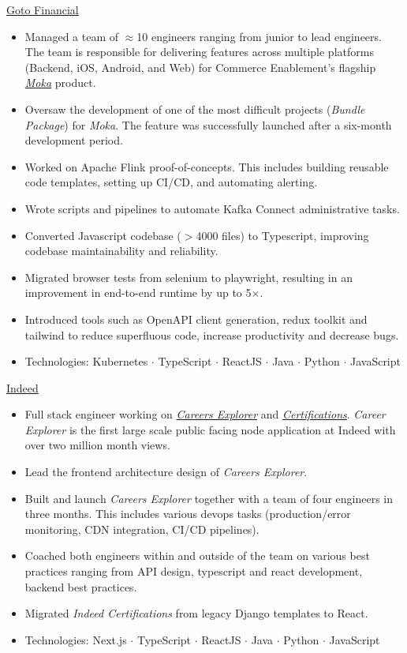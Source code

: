 \documentclass[]{cv} %
\begin{document}
\entry
{\href{https://gotofinancial.com/en}{Goto Financial}}
{
\begin{itemize}
\item Managed a team of $\approx$10 engineers ranging from junior to lead engineers. The team is responsible for delivering features across multiple platforms (Backend, iOS, Android, and Web) for Commerce Enablement's flagship \href{https://www.mokapos.com/en}{\emph{Moka}} product.
\item Oversaw the development of one of the most difficult projects (\emph{Bundle Package}) for \emph{Moka}. The feature was successfully launched after a six-month development period.
\item Worked on Apache Flink proof-of-concepts. This includes building reusable code templates, setting up CI/CD, and automating alerting.
\item Wrote scripts and pipelines to automate Kafka Connect administrative tasks.
\item Converted Javascript codebase ($> $4000 files) to Typescript, improving codebase maintainability and reliability.
\item Migrated browser tests from selenium to playwright, resulting in an improvement in end-to-end runtime by up to 5$\times$.
\item Introduced tools such as OpenAPI client generation, redux toolkit and tailwind to reduce superfluous code, increase productivity and decrease bugs.
\item Technologies: Kubernetes $\cdot$ TypeScript $\cdot$ ReactJS $\cdot$ Java $\cdot$ Python $\cdot$ JavaScript
\end{itemize}
}

\entry
{\href{https://www.indeed.com/}{Indeed}}
{
\begin{itemize}
\item Full stack engineer working on \href{https://www.indeed.com/career}{\emph{Careers Explorer}} and \href{https://www.indeed.com/certifications/}{\emph{Certifications}}. \emph{Career Explorer} is the first large scale public facing node application at Indeed with over two million month views.
\item Lead the frontend architecture design of \emph{Careers Explorer}.
\item Built and launch \emph{Careers Explorer} together with a team of four engineers in three months. This includes various devops tasks (production/error monitoring, CDN integration, CI/CD pipelines).
\item Coached both engineers within and outside of the team on various best practices ranging from API design, typescript and react development, backend best practices.
\item Migrated \emph{Indeed Certifications} from legacy Django templates to React.
\item Technologies: Next.js $\cdot$ TypeScript $\cdot$ ReactJS $\cdot$ Java $\cdot$ Python $\cdot$ JavaScript
\end{itemize}
}
\end{document}
